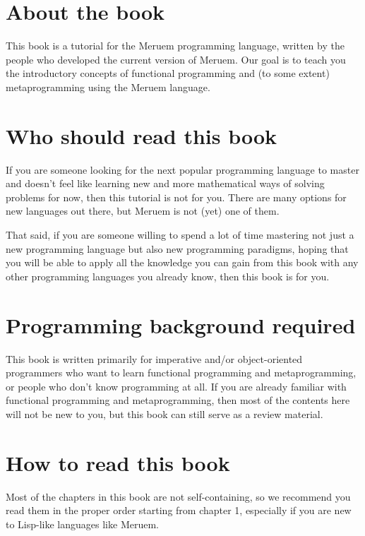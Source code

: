 \section{About the book}
This book is a tutorial for the Meruem programming language, written by the people who developed the current version of Meruem. Our goal is to teach you the introductory concepts of functional programming and (to some extent) metaprogramming using the Meruem language. 

\section{Who should read this book}
If you are someone looking for the next popular programming language to master and doesn't feel like learning new and more mathematical ways of solving problems for now, then this tutorial is not for you. There are many options for new languages out there, but Meruem is not (yet) one of them.

That said, if you are someone willing to spend a lot of time mastering not just a new programming language but also new programming paradigms, hoping that you will be able to apply all the knowledge you can gain from this book with any other programming languages you already know, then this book is for you.

\section{Programming background required}
This book is written primarily for imperative and/or object-oriented programmers who want to learn functional programming and metaprogramming, or people who don't know programming at all. If you are already familiar with functional programming and metaprogramming, then most of the contents here will not be new to you, but this book can still serve as a review material.

\section{How to read this book}
Most of the chapters in this book are not self-containing, so we recommend you read them in the proper order starting from chapter 1, especially if you are new to Lisp-like languages like Meruem. 